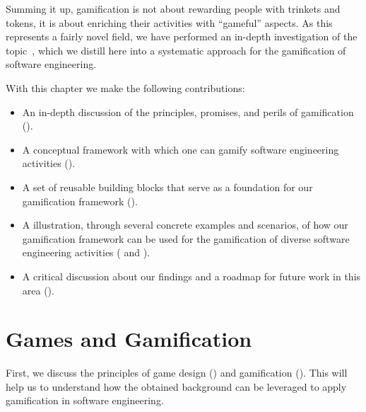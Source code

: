 Summing it up, gamification is not about rewarding people with trinkets and tokens, it is about enriching their activities with ``gameful'' aspects.
As this represents a fairly novel field, we have performed an in-depth investigation of the topic~\cite{Mast2014a}, which we distill here into a systematic approach for the gamification of software engineering.

With this chapter we make the following contributions:

\begin{itemize}

\item An in-depth discussion of the principles, promises, and perils of gamification ().

\item A conceptual framework with which one can gamify software engineering activities ().

\item A set of reusable building blocks that serve as a foundation for our gamification framework ().

\item A illustration, through several concrete examples and scenarios, of how our gamification framework can be used for the gamification of diverse software engineering activities ( and ).

\item A critical discussion about our findings and a roadmap for future work in this area ().

\end{itemize}


\section{Games and Gamification} \label{sec:gamification-principles}

First, we discuss the principles of game design () and gamification ().
This will help us to understand how the obtained background can be leveraged to apply gamification in software engineering.

